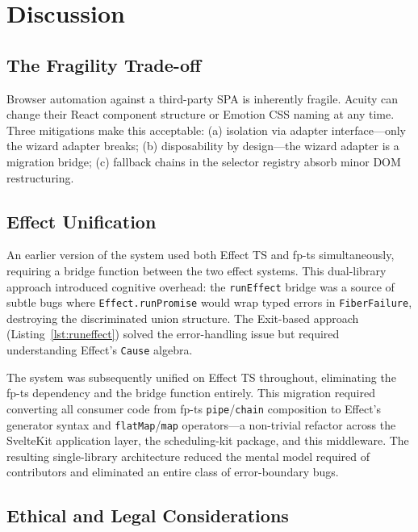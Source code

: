 \documentclass[conference]{IEEEtran}
\begin{document}
\section{Discussion}

\subsection{The Fragility Trade-off}

Browser automation against a third-party SPA is inherently fragile. Acuity can change their React component structure or Emotion CSS naming at any time. Three mitigations make this acceptable: (a) isolation via adapter interface---only the wizard adapter breaks; (b) disposability by design---the wizard adapter is a migration bridge; (c) fallback chains in the selector registry absorb minor DOM restructuring.

\subsection{Effect Unification}

An earlier version of the system used both Effect TS and fp-ts simultaneously, requiring a bridge function between the two effect systems. This dual-library approach introduced cognitive overhead: the \texttt{runEffect} bridge was a source of subtle bugs where \texttt{Effect.runPromise} would wrap typed errors in \texttt{FiberFailure}, destroying the discriminated union structure. The Exit-based approach (Listing~\ref{lst:runeffect}) solved the error-handling issue but required understanding Effect's \texttt{Cause} algebra.

The system was subsequently unified on Effect TS throughout, eliminating the fp-ts dependency and the bridge function entirely. This migration required converting all consumer code from fp-ts \texttt{pipe}/\texttt{chain} composition to Effect's generator syntax and \texttt{flatMap}/\texttt{map} operators---a non-trivial refactor across the SvelteKit application layer, the scheduling-kit package, and this middleware. The resulting single-library architecture reduced the mental model required of contributors and eliminated an entire class of error-boundary bugs.

\subsection{Ethical and Legal Considerations}
\end{document}
